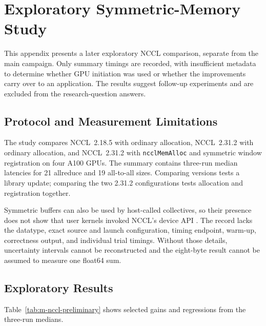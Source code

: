 \chapter{Exploratory Symmetric-Memory Study}\label{app:nccl-preliminary}

This appendix presents a later exploratory NCCL comparison, separate from the main campaign. Only summary timings are recorded, with insufficient metadata to determine whether GPU initiation was used or whether the improvements carry over to an application. The results suggest follow-up experiments and are excluded from the research-question answers.

\section{Protocol and Measurement Limitations}\label{sec:nccl-preliminary-method}

The study compares NCCL~2.18.5 with ordinary allocation, NCCL~2.31.2 with ordinary allocation, and NCCL~2.31.2 with \texttt{ncclMemAlloc} and symmetric window registration on four A100 GPUs. The summary contains three-run median latencies for 21 allreduce and 19 all-to-all sizes. Comparing versions tests a library update; comparing the two 2.31.2 configurations tests allocation and registration together.

Symmetric buffers can also be used by host-called collectives, so their presence does not show that user kernels invoked NCCL's device API \cite{nvidia_nccl_registration_2026,nvidia_nccl_device_2026}. The record lacks the datatype, exact source and launch configuration, timing endpoint, warm-up, correctness output, and individual trial timings. Without those details, uncertainty intervals cannot be reconstructed and the eight-byte result cannot be assumed to measure one float64 sum.

\section{Exploratory Results}\label{sec:nccl-preliminary-results}

Table~\ref{tab:m-nccl-preliminary} shows selected gains and regressions from the three-run medians.

